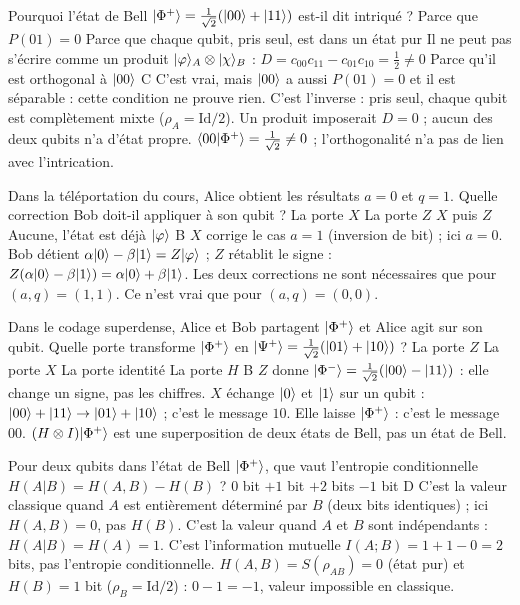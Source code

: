   {Pourquoi l'état de Bell $|\Phi^+\rangle=\frac{1}{\sqrt2}(|00\rangle+|11\rangle)$ est-il dit intriqué ?}
  {Parce que $P(01)=0$}
  {Parce que chaque qubit, pris seul, est dans un état pur}
  {Il ne peut pas s'écrire comme un produit $|\varphi\rangle_A\otimes|\chi\rangle_B$ : $D=c_{00}c_{11}-c_{01}c_{10}=\frac12\neq0$}
  {Parce qu'il est orthogonal à $|00\rangle$}
  {C}
\qcmx
  {C'est vrai, mais $|00\rangle$ a aussi $P(01)=0$ et il est séparable : cette condition ne prouve rien.}
  {C'est l'inverse : pris seul, chaque qubit est complètement mixte ($\rho_A=\mathrm{Id}/2$).}
  {Un produit imposerait $D=0$ ; aucun des deux qubits n'a d'état propre.}
  {$\langle 00|\Phi^+\rangle=\frac{1}{\sqrt2}\neq0$ ; l'orthogonalité n'a pas de lien avec l'intrication.}

  {Dans la téléportation du cours, Alice obtient les résultats $a=0$ et $q=1$. Quelle correction Bob doit-il appliquer à son qubit ?}
  {La porte $X$}
  {La porte $Z$}
  {$X$ puis $Z$}
  {Aucune, l'état est déjà $|\varphi\rangle$}
  {B}
\qcmx
  {$X$ corrige le cas $a=1$ (inversion de bit) ; ici $a=0$.}
  {Bob détient $\alpha|0\rangle-\beta|1\rangle=Z|\varphi\rangle$ ; $Z$ rétablit le signe : $Z(\alpha|0\rangle-\beta|1\rangle)=\alpha|0\rangle+\beta|1\rangle$.}
  {Les deux corrections ne sont nécessaires que pour $(a,q)=(1,1)$.}
  {Ce n'est vrai que pour $(a,q)=(0,0)$.}

  {Dans le codage superdense, Alice et Bob partagent $|\Phi^+\rangle$ et Alice agit sur son qubit. Quelle porte transforme $|\Phi^+\rangle$ en $|\Psi^+\rangle=\frac{1}{\sqrt2}(|01\rangle+|10\rangle)$ ?}
  {La porte $Z$}
  {La porte $X$}
  {La porte identité}
  {La porte $H$}
  {B}
\qcmx
  {$Z$ donne $|\Phi^-\rangle=\frac{1}{\sqrt2}(|00\rangle-|11\rangle)$ : elle change un signe, pas les chiffres.}
  {$X$ échange $|0\rangle$ et $|1\rangle$ sur un qubit : $|00\rangle+|11\rangle\to|01\rangle+|10\rangle$ ; c'est le message $10$.}
  {Elle laisse $|\Phi^+\rangle$ : c'est le message $00$.}
  {$(H\otimes I)|\Phi^+\rangle$ est une superposition de deux états de Bell, pas un état de Bell.}

  {Pour deux qubits dans l'état de Bell $|\Phi^+\rangle$, que vaut l'entropie conditionnelle $H(A|B)=H(A,B)-H(B)$ ?}
  {$0$ bit}
  {$+1$ bit}
  {$+2$ bits}
  {$-1$ bit}
  {D}
\qcmx
  {C'est la valeur classique quand $A$ est entièrement déterminé par $B$ (deux bits identiques) ; ici $H(A,B)=0$, pas $H(B)$.}
  {C'est la valeur quand $A$ et $B$ sont indépendants : $H(A|B)=H(A)=1$.}
  {C'est l'information mutuelle $I(A;B)=1+1-0=2$ bits, pas l'entropie conditionnelle.}
  {$H(A,B)=S(\rho_{AB})=0$ (état pur) et $H(B)=1$ bit ($\rho_B=\mathrm{Id}/2$) : $0-1=-1$, valeur impossible en classique.}

